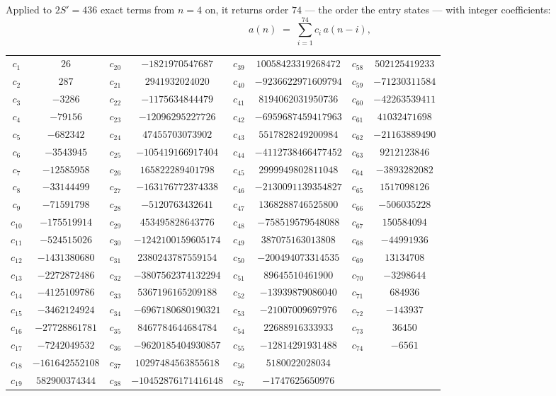 \documentclass[11pt,a4paper]{article}
\theoremstyle{plain}
\theoremstyle{definition}
\begin{document}
Applied to $2S'=436$ exact terms from $n=4$ on, it returns order $74$ --- the
order the entry states --- with integer coefficients:
\[
a(n)\;=\;\sum_{i=1}^{74}c_i\,a(n-i),
\]
\begin{center}\small
\begin{tabular}{cccccccc}
$c_{1}$ & $26$ & $c_{20}$ & $-1821970547687$ & $c_{39}$ & $10058423319268472$ & $c_{58}$ & $502125419233$ \\
$c_{2}$ & $287$ & $c_{21}$ & $2941932024020$ & $c_{40}$ & $-9236622971609794$ & $c_{59}$ & $-71230311584$ \\
$c_{3}$ & $-3286$ & $c_{22}$ & $-1175634844479$ & $c_{41}$ & $8194062031950736$ & $c_{60}$ & $-42263539411$ \\
$c_{4}$ & $-79156$ & $c_{23}$ & $-12096295227726$ & $c_{42}$ & $-6959687459417963$ & $c_{61}$ & $41032471698$ \\
$c_{5}$ & $-682342$ & $c_{24}$ & $47455703073902$ & $c_{43}$ & $5517828249200984$ & $c_{62}$ & $-21163889490$ \\
$c_{6}$ & $-3543945$ & $c_{25}$ & $-105419166917404$ & $c_{44}$ & $-4112738466477452$ & $c_{63}$ & $9212123846$ \\
$c_{7}$ & $-12585958$ & $c_{26}$ & $165822289401798$ & $c_{45}$ & $2999949802811048$ & $c_{64}$ & $-3893282082$ \\
$c_{8}$ & $-33144499$ & $c_{27}$ & $-163176772374338$ & $c_{46}$ & $-2130091139354827$ & $c_{65}$ & $1517098126$ \\
$c_{9}$ & $-71591798$ & $c_{28}$ & $-5120763432641$ & $c_{47}$ & $1368288746525800$ & $c_{66}$ & $-506035228$ \\
$c_{10}$ & $-175519914$ & $c_{29}$ & $453495828643776$ & $c_{48}$ & $-758519579548088$ & $c_{67}$ & $150584094$ \\
$c_{11}$ & $-524515026$ & $c_{30}$ & $-1242100159605174$ & $c_{49}$ & $387075163013808$ & $c_{68}$ & $-44991936$ \\
$c_{12}$ & $-1431380680$ & $c_{31}$ & $2380243787559154$ & $c_{50}$ & $-200494073314535$ & $c_{69}$ & $13134708$ \\
$c_{13}$ & $-2272872486$ & $c_{32}$ & $-3807562374132294$ & $c_{51}$ & $89645510461900$ & $c_{70}$ & $-3298644$ \\
$c_{14}$ & $-4125109786$ & $c_{33}$ & $5367196165209188$ & $c_{52}$ & $-13939879086040$ & $c_{71}$ & $684936$ \\
$c_{15}$ & $-3462124924$ & $c_{34}$ & $-6967180680190321$ & $c_{53}$ & $-21007009697976$ & $c_{72}$ & $-143937$ \\
$c_{16}$ & $-27728861781$ & $c_{35}$ & $8467784644684784$ & $c_{54}$ & $22688916333933$ & $c_{73}$ & $36450$ \\
$c_{17}$ & $-7242049532$ & $c_{36}$ & $-9620185404930857$ & $c_{55}$ & $-12814291931488$ & $c_{74}$ & $-6561$ \\
$c_{18}$ & $-161642552108$ & $c_{37}$ & $10297484563855618$ & $c_{56}$ & $5180022028034$ &  &  \\
$c_{19}$ & $582900374344$ & $c_{38}$ & $-10452876171416148$ & $c_{57}$ & $-1747625650976$ &  &  \\
\end{tabular}
\end{center}
\end{document}
